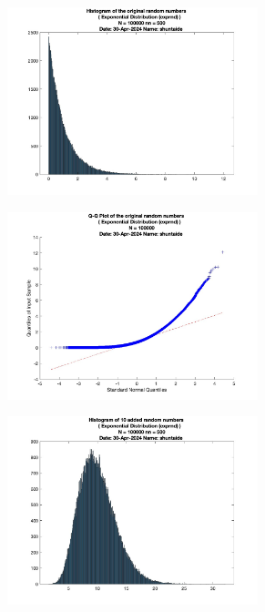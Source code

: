\begin{figure}
	\centering
	\begin{subfigure}{0.48\linewidth}
		\centering
		\includegraphics[width=0.8\textwidth]{src/figures/cl-exp/cl_original_exprnd_hist_N=100000_nn=500.jpg}
		\label{fig:cl-exp-original}
	\end{subfigure}
	\begin{subfigure}{0.48\linewidth}
		\centering
		\includegraphics[width=0.8\textwidth]{src/figures/cl-exp/cl_original_exprnd_qqpl_N=100000.jpg}
		\label{fig:cl-exp-original-qqpl}
	\end{subfigure}
	\begin{subfigure}{0.48\linewidth}
		\centering
		\includegraphics[width=0.8\textwidth]{src/figures/cl-exp/cl_added_exprnd_hist_N=100000_nn=500.jpg}

\end{subfigure}
\end{figure}
